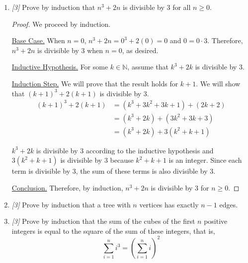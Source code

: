 \documentclass[10pt, letterpaper]{article}
\numberwithin{equation}{section}
\begin{document}
\begin{enumerate}
\begin{proof}
            \underline{Conclusion.} Therefore, by induction, for $n \geq 1$,
            \begin{equation*}
                \sum_{i = 1}^{n} \frac{1}{i(i + 1)} = \frac{n}{n + 1}
            \end{equation*}
        \end{proof}

        \item \textit{[3]} Prove by induction that $n^3 + 2n$ is divisible by $3$ for all
        $n \geq 0$.

        \begin{proof}
            We proceed by induction.

            \underline{Base Case.} When $n = 0$, $n^3 + 2n = 0^3 + 2(0) = 0$ and $0 = 0 \cdot 3$.
            Therefore, $n^3 + 2n$ is divisible by $3$ when $n = 0$, as desired.

            \underline{Inductive Hypothesis.} For some $k \in \mathbb{N}$, assume that $k^3 + 2k$ is
            divisible by $3$.

            \underline{Induction Step.} We will prove that the result holds for $k + 1$. We will
            show that $(k + 1)^3 + 2(k + 1)$ is divisible by $3$.
            \begin{align*}
                (k + 1)^3 + 2(k + 1) & = (k^3 + 3k^2 + 3k + 1) + (2k + 2) \\
                & = (k^3 + 2k) + (3k^2 + 3k + 3) \\
                & = (k^3 + 2k) + 3(k^2 + k + 1)
            \end{align*}

            $k^3 + 2k$ is divisible by $3$ according to the inductive hypothesis and
            $3(k^2 + k + 1)$ is divisible by $3$ because $k^2 + k + 1$ is an integer. Since each
            term is divisible by $3$, the sum of these terms is also divisible by $3$.

            \underline{Conclusion.} Therefore, by induction, $n^3 + 2n$ is divisible by $3$ for
            $n \geq 0$.
        \end{proof}

        \item \textit{[3]} Prove by induction that a tree with $n$ vertices has exactly $n - 1$
        edges.

        \item \textit{[3]} Prove by induction that the sum of the cubes of the first $n$ positive
        integers is equal to the square of the sum of these integers, that is,
        \begin{equation*}
            \sum_{i = 1}^{n} i^3 = (\sum_{i = 1}^{n} i)^2
        \end{equation*}

    \end{enumerate}
\end{document}
